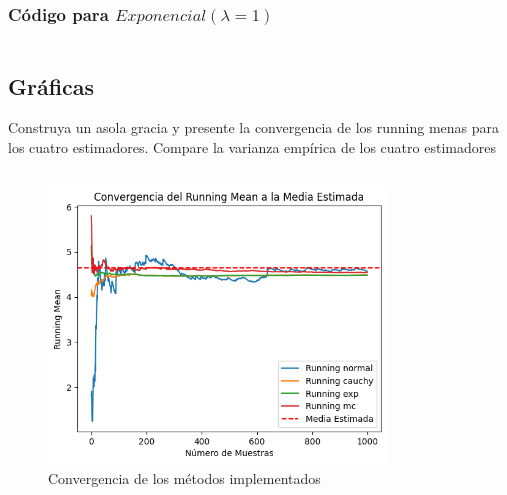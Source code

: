 \documentclass{article}
\begin{document}
\subsubsection{Código para $Exponencial(\lambda=1)$}
\begin{pythonbox}
	\inputminted{python}{code/exp.py}
\end{pythonbox}

\subsection{Gráficas}
Construya un asola gracia y presente la convergencia de los running menas para los cuatro estimadores. Compare la varianza empírica de los
cuatro estimadores

\begin{pythonbox}
	\inputminted{python}{code/all_graphs.py}
\end{pythonbox}


\begin{figure}[H]
	\centering
	\includegraphics[width=0.8\textwidth]{assets/graph.png}
	\caption{Convergencia de los métodos implementados}
\end{figure}
\end{document}
